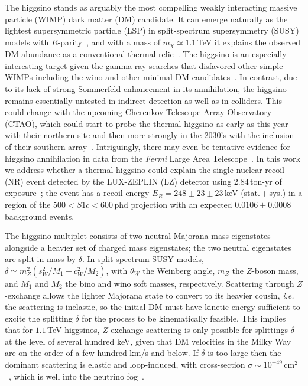 \documentclass[reprint,superscriptaddress,preprintnumbers,amsmath,amssymb,aps,prd,tightenlines,longbibliography,nofootinbib]{revtex4-2}
\begin{document}
\maketitle

The higgsino stands as arguably the most compelling weakly interacting massive particle (WIMP) dark matter (DM) candidate.
It can emerge naturally as the lightest supersymmetric particle (LSP) in split-spectrum supersymmetry (SUSY) models with $R$-parity~\cite{Wells:2003tf,Giudice:2004tc,Arkani-Hamed:2004ymt,Hall:2011jd,Arvanitaki:2012ps,Arkani-Hamed:2012fhg,Co:2021ion}, and with a mass of $m_\chi \simeq 1.1\,$TeV it explains the observed DM abundance as a conventional thermal relic~\cite{Bottaro:2022one}.
The higgsino is an especially interesting target given the gamma-ray searches that disfavored other simple WIMPs including the wino and other minimal DM candidates~\cite{Fan:2013faa,Cohen:2013ama,Rodd:2024qsi,Safdi:2025sfs}. In contrast, due to its lack of strong  Sommerfeld enhancement in its annihilation, the higgsino remains essentially untested in indirect detection as well as in colliders.
This could change with the upcoming Cherenkov Telescope Array Observatory (CTAO), which could start to probe the thermal higgsino as early as this year with their northern site and then more strongly in the 2030's with the inclusion of their southern array~\cite{Rinchiuso:2020skh,Rodd:2024qsi,Abe:2025lci}.  Intriguingly, there may even be tentative evidence for higgsino annihilation in data from the \textit{Fermi} Large Area Telescope~\cite{Dessert:2022evk}.  
In this work we address whether a thermal higgsino could explain the single nuclear-recoil (NR) event detected by the LUX-ZEPLIN (LZ) detector using 2.84\,ton-yr of exposure~\cite{LZ:2026axp}; the event has a recoil energy $E_R = 248 \pm 23 \pm 23$\,keV (stat.\,+\,sys.) in a region of the $500 < S1c < 600$\,phd projection with an expected $0.0106 \pm 0.0008$ background events.

The higgsino multiplet consists of two neutral Majorana mass eigenstates alongside a heavier set of charged mass eigenstates; the two neutral eigenstates are split in mass by $\delta$. In split-spectrum SUSY models, $\delta \simeq m_Z^2 (s_W^2 / M_1 + c_W^2 /M_2)$, with $\theta_W$ the Weinberg angle, $m_Z$ the $Z$-boson mass, and $M_1$ and $M_2$ the bino and wino soft masses, respectively.  Scattering through $Z$-exchange allows the lighter Majorana state to convert to its heavier cousin, {\it i.e.} the scattering is inelastic, so the initial DM must have kinetic energy sufficient to excite the splitting $\delta$ for the process to be kinematically feasible. This implies that for $1.1$\,TeV higgsinos, $Z$-exchange scattering is only possible for splittings $\delta$ at the level of several hundred keV, given that DM velocities in the Milky Way are on the order of a few hundred km/s and below.
If $\delta$ is too large then the dominant scattering is elastic and loop-induced, with cross-section $\sigma \sim 10^{-49}$\,cm$^2$~\cite{Bottaro:2022one}, which is well into the neutrino fog~\cite{Chen:2019gtm,Hill:2014yxa,Nagata:2014wma,OHare:2021utq}.  
\end{document}
